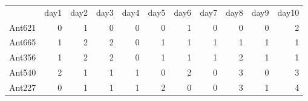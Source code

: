 \begin{tabular}{lrrrrrrrrrr}
{} & {day1} & {day2} & {day3} & {day4} & {day5} & {day6} & {day7} & {day8} & {day9} & {day10} \\
Ant621 & {\cellcolor[HTML]{66C5CC}} \color[HTML]{111111} 0 & {\cellcolor[HTML]{F6CF71}} \color[HTML]{111111} 1 & {\cellcolor[HTML]{66C5CC}} \color[HTML]{111111} 0 & {\cellcolor[HTML]{66C5CC}} \color[HTML]{111111} 0 & {\cellcolor[HTML]{66C5CC}} \color[HTML]{111111} 0 & {\cellcolor[HTML]{F6CF71}} \color[HTML]{111111} 1 & {\cellcolor[HTML]{66C5CC}} \color[HTML]{111111} 0 & {\cellcolor[HTML]{66C5CC}} \color[HTML]{111111} 0 & {\cellcolor[HTML]{66C5CC}} \color[HTML]{111111} 0 & {\cellcolor[HTML]{F89C74}} \color[HTML]{111111} 2 \\
Ant665 & {\cellcolor[HTML]{F6CF71}} \color[HTML]{111111} 1 & {\cellcolor[HTML]{F89C74}} \color[HTML]{111111} 2 & {\cellcolor[HTML]{F89C74}} \color[HTML]{111111} 2 & {\cellcolor[HTML]{66C5CC}} \color[HTML]{111111} 0 & {\cellcolor[HTML]{F6CF71}} \color[HTML]{111111} 1 & {\cellcolor[HTML]{F6CF71}} \color[HTML]{111111} 1 & {\cellcolor[HTML]{F6CF71}} \color[HTML]{111111} 1 & {\cellcolor[HTML]{F6CF71}} \color[HTML]{111111} 1 & {\cellcolor[HTML]{F6CF71}} \color[HTML]{111111} 1 & {\cellcolor[HTML]{F6CF71}} \color[HTML]{111111} 1 \\
Ant356 & {\cellcolor[HTML]{F6CF71}} \color[HTML]{111111} 1 & {\cellcolor[HTML]{F89C74}} \color[HTML]{111111} 2 & {\cellcolor[HTML]{F89C74}} \color[HTML]{111111} 2 & {\cellcolor[HTML]{66C5CC}} \color[HTML]{111111} 0 & {\cellcolor[HTML]{F6CF71}} \color[HTML]{111111} 1 & {\cellcolor[HTML]{F6CF71}} \color[HTML]{111111} 1 & {\cellcolor[HTML]{F6CF71}} \color[HTML]{111111} 1 & {\cellcolor[HTML]{F89C74}} \color[HTML]{111111} 2 & {\cellcolor[HTML]{F6CF71}} \color[HTML]{111111} 1 & {\cellcolor[HTML]{F6CF71}} \color[HTML]{111111} 1 \\
Ant540 & {\cellcolor[HTML]{F89C74}} \color[HTML]{111111} 2 & {\cellcolor[HTML]{F6CF71}} \color[HTML]{111111} 1 & {\cellcolor[HTML]{F6CF71}} \color[HTML]{111111} 1 & {\cellcolor[HTML]{F6CF71}} \color[HTML]{111111} 1 & {\cellcolor[HTML]{66C5CC}} \color[HTML]{111111} 0 & {\cellcolor[HTML]{F89C74}} \color[HTML]{111111} 2 & {\cellcolor[HTML]{66C5CC}} \color[HTML]{111111} 0 & {\cellcolor[HTML]{DCB0F2}} \color[HTML]{111111} 3 & {\cellcolor[HTML]{66C5CC}} \color[HTML]{111111} 0 & {\cellcolor[HTML]{DCB0F2}} \color[HTML]{111111} 3 \\
Ant227 & {\cellcolor[HTML]{66C5CC}} \color[HTML]{111111} 0 & {\cellcolor[HTML]{F6CF71}} \color[HTML]{111111} 1 & {\cellcolor[HTML]{F6CF71}} \color[HTML]{111111} 1 & {\cellcolor[HTML]{F6CF71}} \color[HTML]{111111} 1 & {\cellcolor[HTML]{F89C74}} \color[HTML]{111111} 2 & {\cellcolor[HTML]{66C5CC}} \color[HTML]{111111} 0 & {\cellcolor[HTML]{66C5CC}} \color[HTML]{111111} 0 & {\cellcolor[HTML]{DCB0F2}} \color[HTML]{111111} 3 & {\cellcolor[HTML]{F6CF71}} \color[HTML]{111111} 1 & {\cellcolor[HTML]{9EB9F3}} \color[HTML]{111111} 4 \\

\end{tabular}
